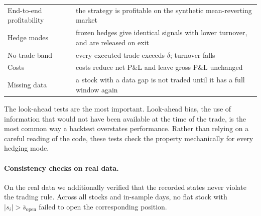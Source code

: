 \begin{table}[ht]
\begin{tabular}{p{}p{}}
End-to-end profitability & the strategy is profitable on the synthetic mean-reverting market \\
Hedge modes & frozen hedges give identical signals with lower turnover, and are released on exit \\
No-trade band & every executed trade exceeds $\delta$; turnover falls \\
Costs & costs reduce net P\&L and leave gross P\&L unchanged \\
Missing data & a stock with a data gap is not traded until it has a full window again \\
\bottomrule
\end{tabular}
\end{table}

The look-ahead tests are the most important. Look-ahead bias, the use of information that would
not have been available at the time of the trade, is the most common way a backtest overstates
performance. Rather than relying on a careful reading of the code, these tests check the
property mechanically for every hedging mode.

\paragraph{Consistency checks on real data.}
On the real data we additionally verified that the recorded states never violate the trading
rule. Across all stocks and in-sample days, no flat stock with $|s_i| > \bar s_{\text{open}}$
failed to open the corresponding position.

